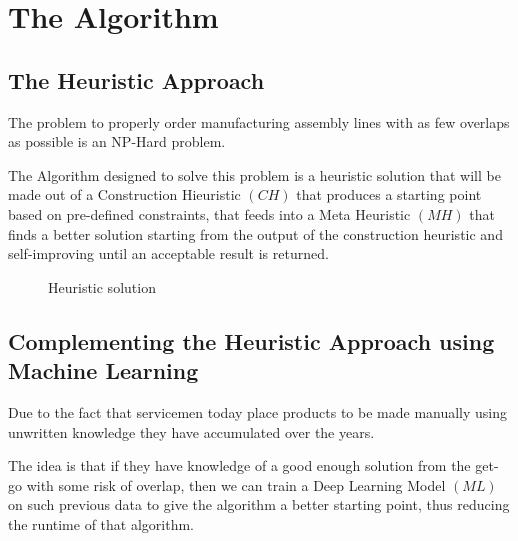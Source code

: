 \documentclass[12pt,a4paper]{report}
\begin{document}
\section{The Algorithm}
\subsection{The Heuristic Approach}

The problem to properly order manufacturing assembly lines with as few overlaps as possible is an NP-Hard problem. 

The Algorithm designed to solve this problem is a heuristic solution that will be made out of a Construction Hieuristic $(C\!H)$ that produces a starting point based on pre-defined constraints, that feeds into a Meta Heuristic $(M\!H)$ that finds a better solution starting from the output of the construction heuristic and self-improving until an acceptable result is returned. 
\vspace{2em} 
\begin{figure}[ht]
    \centering

    \caption{Heuristic solution}
    \label{fig:ml_solution}
\end{figure}

\subsection{Complementing the Heuristic Approach using Machine Learning}
Due to the fact that servicemen today place products to be made manually using unwritten knowledge they have accumulated over the years.

The idea is that if they have knowledge of a good enough solution from the get-go with some risk of overlap, then we can train a Deep Learning Model $(M\!L)$ on such previous data to give the algorithm a better starting point, thus reducing the runtime of that algorithm.
\end{document}
